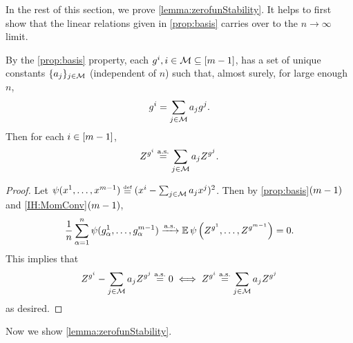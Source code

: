 \documentclass[main.tex]{subfiles}
\begin{document}
In the rest of this section, we prove \cref{lemma:zerofunStability}.
It helps to first show that the linear relations given in \ref{prop:basis} carries over to the $n\to\infty$ limit.
\begin{prop}\label{prop:limitbasis}
By the \ref{prop:basis} property, each $g^i, i \in \mathcal{M} \subseteq [m-1]$, has a set of unique constants $\{a_j\}_{j \in \mathcal{M}}$ (independent of $n$) such that, almost surely, for large enough $n$,
\[g^i = \sum_{j \in \mathcal{M}} a_j g^j.\]
Then for each $i \in [m-1]$,
\[Z^{g^i} \overset{\mathrm{a.s.}}{=} \sum_{j \in \mathcal{M}} a_j Z^{g^j}
.\]
\end{prop}
\begin{proof}

Let $\psi(x^1, \ldots, x^{\MM-1}) \defeq (x^i - \sum_{j \in \coreset} a_j x^j)^2$.
Then by \ref{prop:basis}$(m-1)$ and \ref{IH:MomConv}$(m-1)$,
\begin{align*}
\frac{1}{n} \sum_{\alpha=1}^n \psi(g^1_\alpha, \ldots, g^{m-1}_\alpha) \xrightarrow{\mathrm{a.s.}} \operatorname*{\mathbb{E}} \psi\left( Z^{g^1}, \ldots, Z^{g^{m-1}}\right) = 0.
\end{align*}
This implies that
\begin{align*}
Z^{g^i} - \sum_{j \in \mathcal{M}} a_j Z^{g^j} \overset{\mathrm{a.s.}}{=} 0
\iff
Z^{g^i} \overset{\mathrm{a.s.}}{=} \sum_{j \in \mathcal{M}} a_j Z^{g^j}
\end{align*}
as desired.

\end{proof}

Now we show \cref{lemma:zerofunStability}.
\end{document}
